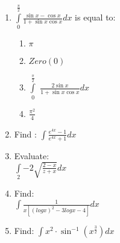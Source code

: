 \documentclass{article}
\begin{document}
\begin{enumerate}
	\item $\int\limits_0^{\frac{\pi}{2}} \frac{\sin x - \cos x}{1 + \sin x\cos x}dx$ is equal to:
		 \begin{enumerate}
			 \item $\pi$
			 \item $Zero(0)$
			 \item $\int\limits_0^{\frac{\pi}{2}}$ $\frac{2\sin x}{1+ \sin x\cos x}dx$
			 \item $\frac{\pi^{2}}{4}$
		 \end{enumerate}
	 \item Find : $\int \frac{e^{4x}-1}{e^{4x}+1}dx$
	 \item Evaluate:\\
		 $\int\limits_{2}{-2} \sqrt{\frac{2-x}{z+x}}dx$ 
	 \item Find: \\
		$\int \frac{1}{x[(logx)^{2} - 3logx - 4]}dx$
	\item Find: $\int x^{2} \cdot \sin^{-1} (x^{\frac{3}{2}})dx$ 
\end{enumerate}
\end{document}
